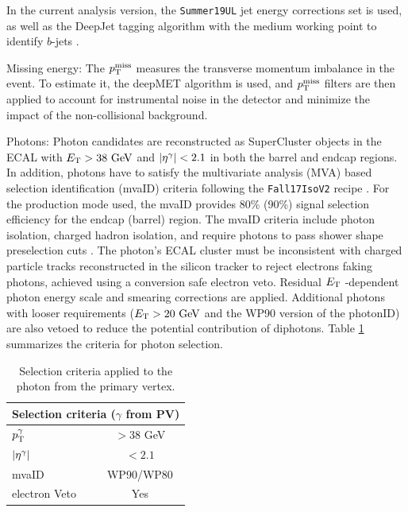 \begin{myitemlist}
    In the current analysis version, the \verb+Summer19UL+ jet energy corrections set is used, as well as the DeepJet tagging algorithm with the medium working point to identify $b$-jets \cite{Bols:2020bkb}.

    \item[Missing energy:] The $p_\text{T}^{\text{miss}}$ measures the transverse momentum imbalance in the event. To estimate it, the deepMET algorithm \cite{Feng:2744871} is used, and $p_\text{T}^{\text{miss}}$ filters are then applied to account for instrumental noise in the detector and minimize the impact of the non-collisional background.
    
    \item[Photons:] Photon candidates are reconstructed as SuperCluster objects in the ECAL with $E_\text{T} > 38\ \text{GeV}$ and $\left\lvert\eta^{\gamma}\right\rvert < 2.1$ in both the barrel and endcap regions. In addition, photons have to satisfy the multivariate analysis (MVA) based selection identification (mvaID) criteria following the \verb+Fall17IsoV2+ recipe \cite{CMS:2020uim}. For the production mode used, the mvaID provides 80\% (90\%) signal selection efficiency for the endcap (barrel) region. The mvaID criteria include photon isolation, charged hadron isolation, and require photons to pass shower shape preselection cuts \cite{Rembser:2019ijh}. The photon's ECAL cluster must be inconsistent with charged particle tracks reconstructed in the silicon tracker to reject electrons faking photons, achieved using a conversion safe electron veto. Residual $E_\text{T}$ -dependent photon energy scale and smearing corrections are applied. Additional photons with looser requirements ($E_\text{T} > 20\ \text{GeV}$ and the WP90 version of the photonID) are also vetoed to reduce the potential contribution of diphotons. Table \ref{tab:photon_selection} summarizes the criteria for photon selection.

    \begin{table}[!ht]
        \centering
        \begin{tabular}{|l|c|}
            \hline
                \multicolumn{2}{|c|}{\cellcolor{lightgray}Selection criteria ($\gamma$ from PV)}\\ \hline
                $p_\text{T}^{\gamma}$            &$>38$ GeV\\
                $\left\lvert\eta^{\gamma}\right\rvert$       &$<2.1$ \\
                mvaID                       &WP90/WP80 \\
                electron Veto               &Yes \\\hline
            \end{tabular}
        \caption{Selection criteria applied to the photon from the primary vertex.}
        \label{tab:photon_selection}
    \end{table}
\end{myitemlist}

